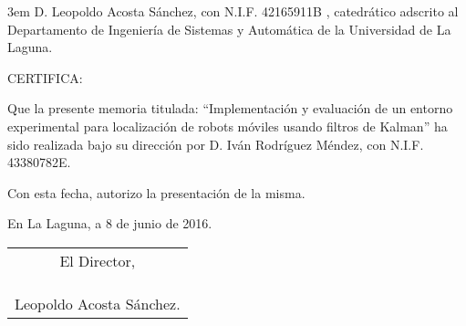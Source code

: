 \cleardoublepage
\thispagestyle{empty}
\hfill\begin{minipage}[t]{0.85\textwidth}\parindent 3em
D. Leopoldo Acosta Sánchez, con N.I.F. 42165911B , catedrático
adscrito al Departamento de Ingeniería de Sistemas y Automática de la Universidad de La
Laguna.

\null\vspace{\baselineskip}
CERTIFICA:

\vspace{\baselineskip}
Que la presente memoria titulada: “Implementación y evaluación de un entorno experimental para localización de robots móviles usando filtros de Kalman” ha sido realizada bajo su dirección por D.
Iván Rodríguez Méndez, con N.I.F. 43380782E. 

\vspace{\baselineskip}
Con esta fecha, autorizo la presentación de la misma.

\vspace{\baselineskip}
\hfill En La Laguna, a 8 de junio de 2016.
\end{minipage}

\vspace{\baselineskip}
\hfill\begin{tabular}{c}
El Director, \\\\\\\\
Leopoldo Acosta Sánchez.
\end{tabular}
